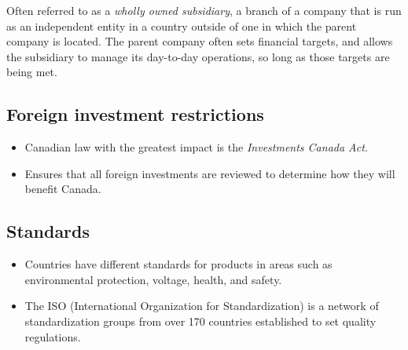 \begin{definition}
    Often referred to as a \textit{wholly owned subsidiary}, a 
    branch of a company that is run as an independent entity in a country outside of one 
    in which the parent company is located. The parent company often sets financial 
    targets, and allows the subsidiary to manage its day-to-day operations, 
    so long as those targets are being met.
\end{definition}

\subsection{Foreign investment restrictions}
\begin{itemize}
    \item Canadian law with the greatest impact is the \textit{Investments Canada Act}.
    \item Ensures that all foreign investments are reviewed to determine how they will benefit Canada.
\end{itemize}

\subsection{Standards}
\begin{itemize}
    \item Countries have different standards for products in areas such as environmental protection, voltage, health, and safety.
    \item The ISO (International Organization for Standardization) is a network of standardization 
    groups from over 170 countries established to set quality regulations.
\end{itemize}